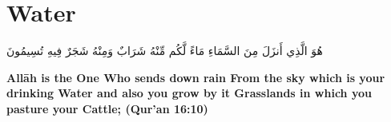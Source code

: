 \chapter{Water}
\begin{center}
    {\Huge    
        \begin{Arabic}
            هُوَ الَّذِي أَنزَلَ مِنَ السَّمَاءِ مَاءً لَّكُم مِّنْهُ شَرَابٌ وَمِنْهُ شَجَرٌ فِيهِ تُسِيمُونَ
        \end{Arabic}
    }    
\end{center}
\vspace*{\fill}
\vspace{3cm}
\begin{center}
    \large \textbf{Allāh is the One Who sends down rain From the sky which is your drinking Water and also you grow by it Grasslands in which you pasture your Cattle; (Qur'an 16:10)}
\end{center}
